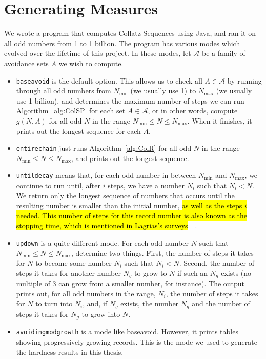 \section{Generating Measures} \label{subsec:algcomp}
We wrote a program that computes Collatz Sequences using Java, and ran it on all odd numbers from 1 to 1 billion. The program has various modes which evolved over the lifetime of this project. In these modes, let $\mathcal{A}$ be a family of avoidance sets $A$ we wish to compute.
\begin{itemize}
    \item {\tt baseavoid} is the default option. This allows us to check all $A \in \mathcal{A}$ by running through all odd numbers from $N_{\min}$ (we usually use 1) to $N_{\max}$ (we usually use 1 billion), and determines the maximum number of steps we can run Algorithm~\ref{alg:ColSP} for each set $A \in \mathcal{A}$, or in other words, compute $g(N,A)$ for all odd $N$ in the range $N_{\min} \leq N \leq N_{\max}$. When it finishes, it prints out the longest sequence for each $A$.
    \item {\tt entirechain} just runs Algorithm~\ref{alg:ColR} for all odd $N$ in the range $N_{\min} \leq N \leq N_{\max}$, and prints out the longest sequence.
    \item {\tt untildecay} means that, for each odd number in between $N_{\min}$ and $N_{\max}$, we continue to run until, after $i$ steps, we have a number $N_i$ such that $N_i < N$. We return only the longest sequence of numbers that occurs until the resulting number is smaller than the initial number, \hl{as well as the steps $i$ needed. This number of steps for this record number is also known as the stopping time, which is mentioned in Lagrias's surveys}~\cite{2003mathLagrais}~\cite{2006mathLagrias}.
    \item {\tt updown} is a quite different mode. For each odd number $N$ such that $N_{\min}\leq N \leq N_{\max}$, determine two things. First, the number of steps it takes for $N$ to become some number $N_i$ such that $N_i < N$. Second, the number of steps it takes for another number $N_g$ to grow to $N$ if such an $N_g$ exists (no multiple of 3 can grow from a smaller number, for instance). The output prints out, for all odd numbers in the range, $N_i$, the number of steps it takes for $N$ to turn into $N_i$, and, if $N_g$ exists, the number $N_g$ and the number of steps it takes for $N_g$ to grow into $N$.
    \item {\tt avoidingmodgrowth} is a mode like baseavoid. However, it prints tables showing progressively growing records. This is the mode we used to generate the hardness results in this thesis.
\end{itemize}
